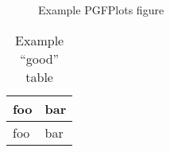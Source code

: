 \begin{figure}[h]
  \centering 
  \caption{Example PGFPlots figure}
\end{figure}

\begin{table}
  \begin{tabular}{ll}
    \toprule
    foo & bar \\
    \midrule
    foo & bar \\
    \bottomrule
  \end{tabular}
  \caption{Example ``good'' table}
\end{table}
